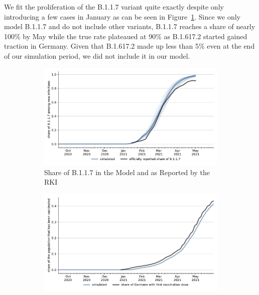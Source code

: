 \FloatBarrier

We fit the proliferation of the B.1.1.7 variant quite exactly despite only introducing a
few cases in January as can be seen in Figure~\ref{fig:fit_share_b117}. Since we only
model B.1.1.7 and do not include other variants, B.1.1.7 reaches a share of nearly 100\%
by May while the true rate plateaued at 90\% as B.1.617.2 started gained traction in
Germany. Given that B.1.617.2 made up less than 5\% even at the end of our simulation
period, we did not include it in our model.

\begin{figure}[ht]
  \centering

  \begin{subfigure}[b]{0.425\textwidth}   %
    \centering
    \includegraphics[width=\textwidth]{figures/results/figures/scenario_comparisons/combined_fit/full_share_b117_with_single_runs}
    \caption{Share of B.1.1.7 in the Model and as Reported by the RKI}
    \label{fig:fit_share_b117}
  \end{subfigure}
  \hfill
  \begin{subfigure}[b]{0.425\textwidth}    %
    \centering
    \includegraphics[width=\textwidth]{figures/results/figures/scenario_comparisons/combined_fit/full_ever_vaccinated}

\end{subfigure}
\end{figure}
